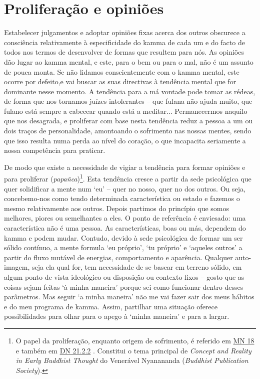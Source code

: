 \section{Proliferação e opiniões}

Estabelecer julgamentos e adoptar opiniões fixas acerca dos outros obscurece a consciência relativamente à especificidade do kamma de cada um e do facto de todos nos termos de desenvolver de formas que resultem para nós. As opiniões dão lugar ao kamma mental, e este, para o bem ou para o mal, não é um assunto de pouca monta. Se não lidamos conscientemente com o kamma mental, este ocorre por defeito,e vai buscar as suas directivas à tendência mental que for dominante nesse momento. A tendência para a má vontade pode tomar as rédeas, de forma que nos tornamos juízes intolerantes -- que fulana não ajuda muito, que fulano está sempre a cabecear quando está a meditar... Permanecermos naquilo que nos desagrada, e proliferar com base nesta tendência reduz a pessoa a um ou dois traços de personalidade, amontoando o sofrimento nas nossas mentes, sendo que isso resulta numa perda ao nível do coração, o que incapacita seriamente a nossa competência para praticar.

De modo que existe a necessidade de vigiar a tendência para formar opiniões e para proliferar (\emph{papañca})\footnote{O papel da proliferação, enquanto origem de sofrimento, é referido em \href{https://suttacentral.net/mn18/en/sujato}{MN 18} e também em \href{https://suttacentral.net/dn21/en/sujato}{DN 21.2.2} . Constitui o tema principal de \emph{Concept and Reality in Early Buddhist Thought} do Venerável Nyanananda (\emph{Buddhist Publication Society}).}. Esta tendência cresce a partir da sede psicológica que quer solidificar a mente num `eu' -- quer no nosso, quer no dos outros. Ou seja, concebemo-nos como tendo determinada característica ou estado e fazemos o mesmo relativamente aos outros. Depois partimos do princípio que somos melhores, piores ou semelhantes a eles. O ponto de referência é enviesado: uma característica não é uma pessoa. As características, boas ou más, dependem do kamma e podem mudar. Contudo, devido à sede psicológica de formar um ser sólido contínuo, a mente formula `eu próprio', `tu próprio' e `aqueles outros' a partir do fluxo mutável de energias, comportamento e aparência. Qualquer auto-imagem, seja ela qual for, tem necessidade de se basear em terreno sólido, em algum ponto de vista ideológico ou disposição ou contexto fixos -- gosto que as coisas sejam feitas `à minha maneira' porque sei como funcionar dentro desses parâmetros. Mas seguir `a minha maneira' não me vai fazer sair dos meus hábitos e do meu programa de kamma. Assim, partilhar uma situação oferece possibilidades para olhar para o apego à `minha maneira' e para a largar.

